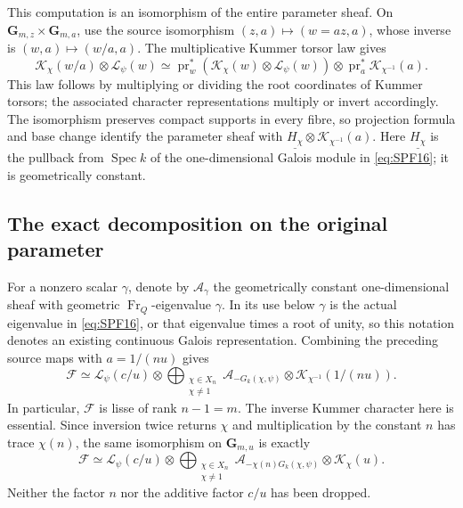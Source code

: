 This computation is an isomorphism of the entire parameter
sheaf. On
\(\mathbf G_{m,z}\times\mathbf G_{m,a}\), use the source
isomorphism
\((z,a)\mapsto(w=az,a)\), whose inverse is
\((w,a)\mapsto(w/a,a)\).
The multiplicative Kummer torsor law gives
\[
 \mathcal K_\chi(w/a)\otimes\mathcal L_\psi(w)
  \simeq
 \operatorname{pr}_w^*
       (\mathcal K_\chi(w)\otimes\mathcal L_\psi(w))
      \otimes\operatorname{pr}_a^*\mathcal K_{\chi^{-1}}(a).
 \tag{SPF.17}\label{eq:SPF17}
\]
This law follows by multiplying or dividing the root coordinates
of Kummer torsors; the associated character representations
multiply or invert accordingly. The isomorphism preserves
compact supports in every fibre, so projection formula and
base change identify the parameter sheaf with
\(\underline{H_\chi}\otimes\mathcal K_{\chi^{-1}}(a)\).
Here \(\underline{H_\chi}\) is the pullback from
\(\operatorname{Spec}k\) of the one-dimensional Galois module
in \eqref{eq:SPF16}; it is geometrically constant.

\subsection{The exact decomposition on the original parameter}

For a nonzero scalar \(\gamma\), denote by \(\mathcal A_\gamma\)
the geometrically constant one-dimensional sheaf with geometric
\(\operatorname{Fr}_Q\)-eigenvalue \(\gamma\). In its use below
\(\gamma\) is the actual eigenvalue in \eqref{eq:SPF16}, or
that eigenvalue times a root of unity, so this notation
denotes an existing continuous Galois representation.
Combining the preceding source maps with
\(a=1/(nu)\) gives
\[
 \boxed{\displaystyle
 \mathcal F\simeq
 \mathcal L_\psi(c/u)\otimes
 \bigoplus_{\substack{\chi\in X_n\\\chi\ne1}}
  \mathcal A_{-G_k(\chi,\psi)}
           \otimes\mathcal K_{\chi^{-1}}(1/(nu)).}
 \tag{SPF.18}\label{eq:SPF18}
\]
In particular, \(\mathcal F\) is lisse of rank \(n-1=m\).
The inverse Kummer character here is essential.
Since inversion twice returns \(\chi\) and multiplication by
the constant \(n\) has trace \(\chi(n)\), the same isomorphism
on \(\mathbf G_{m,u}\) is exactly
\[
 \boxed{\displaystyle
 \mathcal F\simeq
 \mathcal L_\psi(c/u)\otimes
 \bigoplus_{\substack{\chi\in X_n\\\chi\ne1}}
  \mathcal A_{-\chi(n)G_k(\chi,\psi)}
                 \otimes\mathcal K_\chi(u).}
 \tag{SPF.19}\label{eq:SPF19}
\]
Neither the factor \(n\) nor the additive factor \(c/u\) has
been dropped.

